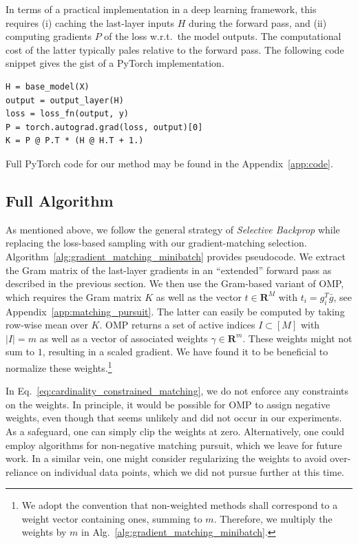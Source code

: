 \documentclass{article}
\newcommand{\R}{\mathbf{R}}
\theoremstyle{plain}
\theoremstyle{definition}
\theoremstyle{remark}
\begin{document}
In terms of a practical implementation in a deep learning framework, this requires (i) caching the last-layer inputs $H$ during the forward pass, and (ii) computing gradients $P$ of the loss w.r.t.~the model outputs.
The computational cost of the latter typically pales relative to the forward pass.
The following code snippet gives the gist of a PyTorch implementation.
\begin{lstlisting}
H = base_model(X)
output = output_layer(H)
loss = loss_fn(output, y)
P = torch.autograd.grad(loss, output)[0]
K = P @ P.T * (H @ H.T + 1.)
\end{lstlisting}
Full PyTorch code for our method may be found in the Appendix~\ref{app:code}.










\subsection{Full Algorithm}
\label{sec:algorithm}

As mentioned above, we follow the general strategy of \emph{Selective Backprop} while replacing the loss-based sampling with our gradient-matching selection.
Algorithm~\ref{alg:gradient_matching_minibatch} provides pseudocode.
We extract the Gram matrix of the last-layer gradients in an ``extended'' forward pass as described in the previous section.
We then use the Gram-based variant of OMP, which requires the Gram matrix $K$ as well as the vector $t\in \R^M$ with $t_i = g_i^T\bar{g}$, see Appendix~\ref{app:matching_pursuit}.
The latter can easily be computed by taking row-wise mean over $K$.
OMP returns a set of active indices $I\subset [M]$ with $\vert I \vert = m$ as well as a vector of associated weights $\gamma \in \R^m$.
These weights might not sum to $1$, resulting in a scaled gradient.
We have found it to be beneficial to normalize these weights.\footnote{
We adopt the convention that non-weighted methods shall correspond to a weight vector containing ones, summing to $m$.
Therefore, we multiply the weights by $m$ in Alg.~\ref{alg:gradient_matching_minibatch}.}

In Eq.~\eqref{eq:cardinality_constrained_matching}, we do not enforce any constraints on the weights.
In principle, it would be possible for OMP to assign negative weights, even though that seems unlikely and did not occur in our experiments.
As a safeguard, one can simply clip the weights at zero.
Alternatively, one could employ algorithms for non-negative matching pursuit, which we leave for future work.
In a similar vein, one might consider regularizing the weights to avoid over-reliance on individual data points, which we did not pursue further at this time.
\end{document}
